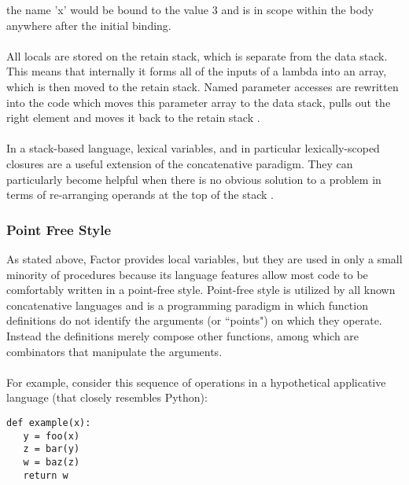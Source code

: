 \documentclass{sig-alternate}
\begin{document}
the name 'x' would be bound to the value 3 and is in scope within the body anywhere after the initial binding.
\\\\
All locals are stored on the retain stack, which is separate from the data stack.  This means that internally it forms all of the inputs of a lambda into an array, which is then moved to the retain stack.  Named parameter accesses are rewritten into the code which moves this parameter array to the data stack, pulls out the right element and moves it back to the retain stack .
\\\\
In a stack-based language, lexical variables, and in particular lexically-scoped closures are a useful extension of the concatenative paradigm.  They can particularly become helpful when there is no obvious solution to a problem in terms of re-arranging operands at the top of the stack . 

\subsubsection{Point Free Style}

As stated above, Factor provides local variables, but they are used in only a small minority of procedures because its language features allow most code to be comfortably written in a point-free style.  Point-free style is utilized by all known concatenative languages and is a programming paradigm in which function definitions do not identify the arguments (or ``points") on which they operate. Instead the definitions merely compose other functions, among which are combinators that manipulate the arguments.
\\\\
For example, consider this sequence of operations in a hypothetical applicative language (that closely resembles Python):

\begin{verbatim}
def example(x):
   y = foo(x)
   z = bar(y)
   w = baz(z)
   return w
\end{verbatim}
\end{document}
